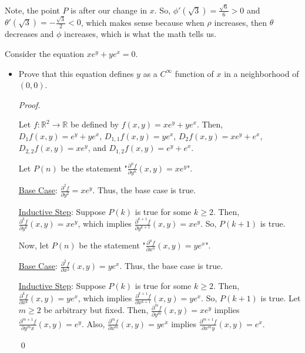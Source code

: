 \documentclass[12pt]{article}
\newenvironment{problem}[2][Problem]{\begin{trivlist}
\item[\hskip \labelsep {\bfseries #1}\hskip \labelsep {\bfseries #2.}]}{\end{trivlist}}
\newenvironment{sol}
    {\emph{Proof.}
    }
    {
    \qed
    }
\begin{document}
\begin{problem}{23}
\begin{itemize}
    Note, the point $P$ is after our change in $x$. So, $\phi'(\sqrt{3}) = \frac{\sqrt{6}}{6} > 0$ and $\theta'(\sqrt{3}) = -\frac{\sqrt{3}}{2} < 0$, which makes sense because when $\rho$ increases, then $\theta$ decreases and $\phi$ increases, which is what the math tells us.
\end{itemize}
\end{problem}


\begin{problem}{24}
Consider the equation $xe^y + ye^x = 0$. 

\begin{itemize}
    \item[(a)] Prove that this equation defines $y$ as a $C^\infty$ function of $x$ in a neighborhood of $(0,0)$.
    
    \begin{sol}
    Let $f : \mathbb{R}^2 \to \mathbb{R}$ be defined by $f(x,y) = xe^y + ye^x$. Then, $D_1f(x,y) = e^y + ye^x$, $D_{1,1}f(x,y) = ye^x$, $D_2f(x,y) = xe^y + e^x$, $D_{2,2}f(x,y) = xe^y$, and $D_{1,2}f(x,y) = e^y+e^x$.
    
    \vspace{1em}
    
    Let $P(n)$ be the statement "$\frac{\partial^n f}{\partial y^n}(x,y) = xe^y$".
    
    \underline{Base Case}: $\frac{\partial^2 f}{\partial y^2} = xe^y$. Thus, the base case is true. 
    
    \underline{Inductive Step}: Suppose $P(k)$ is true for some $k \geq 2$. Then, $\frac{\partial^k f}{\partial y^k}(x,y) = xe^y$, which implies $\frac{\partial^{k+1}f}{\partial y^{k+1}}(x,y) = xe^y$. So, $P(k+1)$ is true.
    
    \vspace{1em}
    
    Now, let $P(n)$ be the statement "$\frac{\partial^n f}{\partial x^n}(x,y) = ye^x$".
    
    \underline{Base Case}: $\frac{\partial^2 f}{\partial x^2}(x,y) = ye^x$. Thus, the base case is true. 
    
    \underline{Inductive Step}: Suppose $P(k)$ is true for some $k \geq 2$. Then, $\frac{\partial^k f}{\partial x^k}(x,y) = ye^x$, which implies $\frac{\partial^{k+1}f}{\partial x^{k+1}}(x,y) = ye^x$. So, $P(k+1)$ is true. Let $m \geq 2$ be arbitrary but fixed. Then, $\frac{\partial^m f}{\partial y^m}(x,y) = xe^y$ implies $\frac{\partial^{m+1} f}{\partial y^mx}(x,y) = e^y$. Also, $\frac{\partial^m f}{\partial x^m}(x,y) = ye^x$ implies $\frac{\partial^{m+1} f}{\partial x^my}(x,y) = e^x$. 
    

\end{sol}
\end{itemize}
\end{problem}
\end{document}
